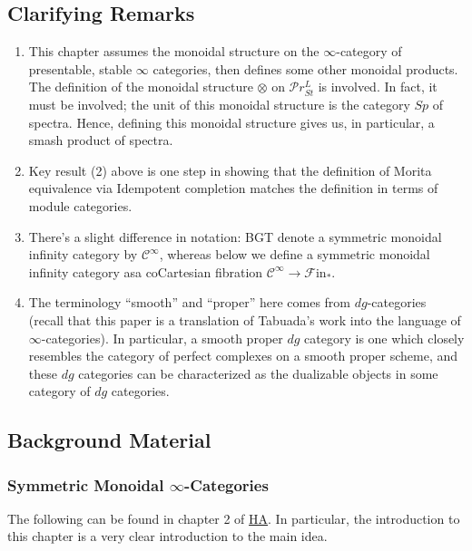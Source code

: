 \documentclass[letterpaper]{article}
\theoremstyle{definition}
\newcommand{\mc}{\mathcal}
\begin{document}
\subsection{Clarifying Remarks}

\begin{enumerate}
    \item This chapter assumes the monoidal structure on the
      $\infty$-category of presentable, stable $\infty$ categories,
      then defines some other monoidal products. The definition of the
      monoidal structure $\otimes$ on $\mc Pr_{St}^L$ is involved. In
      fact, it must be involved; the unit of this monoidal
      structure is the category $Sp$ of spectra. Hence, defining
      this monoidal structure gives us, in particular, a smash product
      of spectra.
      \item Key result (2) above is one step in showing that the
        definition of Morita equivalence via Idempotent completion
        matches the definition in terms of module categories. 
        \item There's a slight difference in notation: BGT denote a
          symmetric monoidal infinity category by $\mc C^{\infty}$,
          whereas below we define a symmetric monoidal infinity
          category asa coCartesian fibration $\mc C^{\infty}
          \rightarrow \mathscr F\mathrm{in}_*$.
          \item The terminology ``smooth'' and ``proper'' here comes
            from $dg$-categories (recall that this paper is a
            translation of Tabuada's work into the language of
            $\infty$-categories). In particular, a smooth proper $dg$
            category is one which closely resembles the category of
            perfect complexes on a smooth proper scheme, and these
            $dg$ categories can be characterized as the dualizable
            objects in some category of $dg$ categories.
\end{enumerate}


\subsection{Background Material}

\subsubsection{Symmetric Monoidal $\infty$-Categories}
The following can be found in chapter 2 of \href{References/LurieHigherAlgebra.pdf}{HA}. In particular, the introduction to this chapter is a very clear introduction to the main idea.
\end{document}
